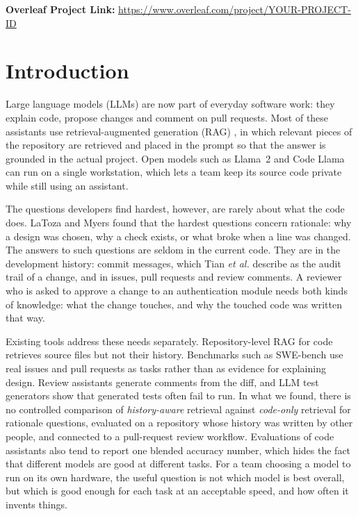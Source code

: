 \documentclass[12pt,onecolumn,draftclsnofoot]{IEEEtran}
\begin{document}
\noindent\textbf{Overleaf Project Link:} \url{https://www.overleaf.com/project/YOUR-PROJECT-ID}

\section{Introduction}

Large language models (LLMs) are now part of everyday software work: they explain code, propose changes and comment on pull requests. Most of these assistants use retrieval-augmented generation (RAG) \cite{lewis2020rag,gao2023ragsurvey}, in which relevant pieces of the repository are retrieved and placed in the prompt so that the answer is grounded in the actual project. Open models such as Llama~2 \cite{touvron2023llama2} and Code Llama \cite{roziere2023codellama} can run on a single workstation, which lets a team keep its source code private while still using an assistant.

The questions developers find hardest, however, are rarely about what the code does. LaToza and Myers \cite{latoza2010hard} found that the hardest questions concern rationale: why a design was chosen, why a check exists, or what broke when a line was changed. The answers to such questions are seldom in the current code. They are in the development history: commit messages, which Tian \emph{et al.} \cite{tian2022commit} describe as the audit trail of a change, and in issues, pull requests and review comments. A reviewer who is asked to approve a change to an authentication module needs both kinds of knowledge: what the change touches, and why the touched code was written that way.

Existing tools address these needs separately. Repository-level RAG for code \cite{zhang2023repocoder} retrieves source files but not their history. Benchmarks such as SWE-bench \cite{jimenez2024swebench} use real issues and pull requests as tasks rather than as evidence for explaining design. Review assistants \cite{li2022codereviewer} generate comments from the diff, and LLM test generators \cite{schafer2024testpilot,alshahwan2024testgen} show that generated tests often fail to run. In what we found, there is no controlled comparison of \emph{history-aware} retrieval against \emph{code-only} retrieval for rationale questions, evaluated on a repository whose history was written by other people, and connected to a pull-request review workflow. Evaluations of code assistants also tend to report one blended accuracy number, which hides the fact that different models are good at different tasks. For a team choosing a model to run on its own hardware, the useful question is not which model is best overall, but which is good enough for each task at an acceptable speed, and how often it invents things.
\end{document}
